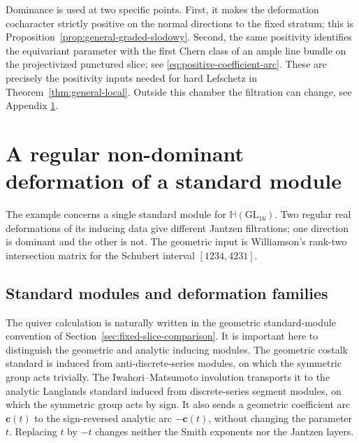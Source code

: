 \documentclass[10pt,a4paper]{amsart}
\newcommand{\Hh}{\mathbb H}
\begin{document}
Dominance is used at two specific points.  First, it makes the deformation
cocharacter strictly positive on the normal directions to the fixed stratum;
this is Proposition~\ref{prop:general-graded-slodowy}.  Second,
the same positivity identifies the equivariant parameter with the first
Chern class of an ample line bundle on the projectivized punctured
slice; see \eqref{eq:positive-coefficient-arc}.  These are precisely the
positivity inputs needed for hard Lefschetz in
Theorem~\ref{thm:general-local}.  Outside this chamber the
filtration can change, see Appendix \ref{app:counterexample}.  

\appendix
\renewcommand{\theequation}{A.\arabic{equation}}
\setcounter{equation}{0}
\section{A regular non-dominant deformation of a standard module}
\label{app:counterexample}

The example concerns a single standard module for
$\Hh(\mathrm{GL}_{16})$.  Two regular real deformations of its inducing
data give different Jantzen filtrations; one direction is dominant and the
other is not.  The geometric input is Williamson's rank-two intersection
matrix for the Schubert interval $[1234,4231]$.

\subsection{Standard modules and deformation families}

The quiver calculation is naturally written in the geometric
standard-module convention of Section~\ref{sec:fixed-slice-comparison}.  It
is important here to distinguish the geometric and analytic inducing
modules.  The geometric costalk standard is induced from anti-discrete-series
modules, on which the symmetric group acts trivially.  The
Iwahori--Matsumoto involution transports it to the analytic Langlands
standard induced from discrete-series segment modules, on which the
symmetric group acts by sign.  It also sends a geometric coefficient arc
$\mathbf c(t)$ to the sign-reversed analytic arc $-\mathbf c(t)$, without
changing the parameter $t$.  Replacing $t$ by $-t$ changes neither the Smith
exponents nor the Jantzen layers.
\end{document}
